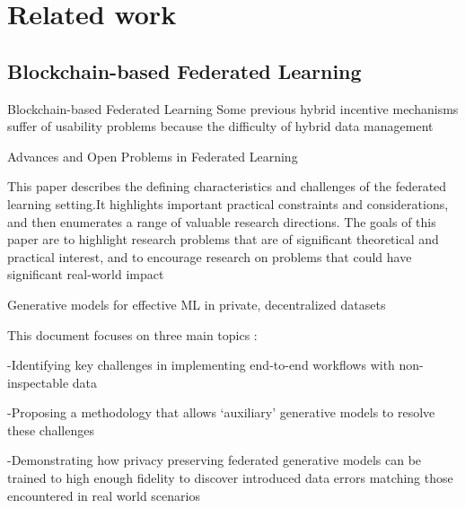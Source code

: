 

\section{Related work}

\subsection{Blockchain-based Federated Learning}

\begin{frame}{Blockchain-based Federated Learning}
     Some previous hybrid incentive mechanisms\cite{paper52} suffer of usability problems because the difficulty of hybrid data management
\end{frame}

\begin{frame}
Advances and Open Problems in Federated Learning\cite{1912.04977}


This paper describes the defining characteristics and challenges of the federated learning setting.It highlights important practical constraints and considerations, and then enumerates a range of valuable
research directions. The goals of this paper are to highlight research problems that are of significant theoretical and practical interest, and to encourage research on problems that could have significant real-world impact
\end{frame}

\begin{frame}
Generative models for effective ML in  private, decentralized datasets\cite{1911.06679}


This document focuses on three main topics : 


-Identifying key challenges in implementing end-to-end workflows with non-inspectable data


-Proposing a methodology that allows ‘auxiliary’ generative models to resolve these challenges


-Demonstrating how privacy preserving federated generative models can be trained to high enough fidelity to discover introduced data errors matching
those encountered in real world scenarios
\end{frame}

